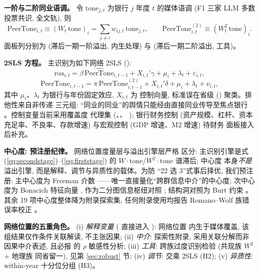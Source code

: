 \textbf{一阶与二阶同业语调。} 令 $\text{tone}_{j,t}$ 为银行 $j$
年度 $t$ 的媒体语调 (F1 三家 LLM 多数投票共识, 全文轨), 则
\begin{equation}
\text{PeerTone}_{i,t} \equiv (W_{t}\,\text{tone})_{i}
= \sum_{j \neq i} w_{ij,t}\,\text{tone}_{j,t},
\qquad
\text{PeerTone}^{(2)}_{i,t} \equiv (W_{t}^{2}\,\text{tone})_{i}.
\label{eq:peertone}
\end{equation}
面板列分别为  (滞后一期一阶溢出,
内生处理) 与  (滞后一期二阶溢出,
工具)。

\textbf{2SLS 方程。} 主识别为如下网络 2SLS
():
\begin{equation}
\text{roa}_{i,t} = \beta\,\widehat{\text{PeerTone}}_{i,t-1}
 + X_{i,t}'\gamma + \mu_{i} + \lambda_{t} + \varepsilon_{i,t},
\label{eq:secondstage}
\end{equation}
\begin{equation}
\text{PeerTone}_{i,t-1} = \pi\,\text{PeerTone}^{(2)}_{i,t-1}
 + X_{i,t}'\delta + \mu_{i} + \lambda_{t} + \nu_{i,t},
\label{eq:firststage}
\end{equation}
其中 $\mu_{i}$、$\lambda_{t}$ 为银行与年份固定效应, $X_{i,t}$ 为
控制向量, 标准误在省级 () 聚类。排他性来自非传递
三元组: ``同业的同业''的舆情只能经由直接同业传导至焦点银行
\parencite{bramoulle2009identification}。控制变量当前采用覆盖度
代理集 (、、
); 银行财务控制 (资产规模、杠杆、资本
充足率、不良率、存款增速) 与宏观控制 (GDP 增速、M2 增速) 待财务
面板接入后补充。

\textbf{中心度: 预注册纪律。} 网络位置度量层与溢出引擎层严格
区分: 主识别引擎是式 (\ref{eq:secondstage})--(\ref{eq:firststage})
的 $W\cdot\text{tone}$/$W^{2}\cdot\text{tone}$ 谱滞后; 中心度
本身\emph{不是}溢出引擎, 而是解释、调节与异质性的载体。为防
``22 选 3''式事后择优, 我们预注册: 主中心度为 Freeman 介数
 \parencite{freeman1978centrality}
——唯一直接量化``跨群信息中介''的中心度; 次中心度为 Bonacich
特征向量 
\parencite{bonacich1972factoring}, 作为二分图信息枢纽对照
\parencite{borgatti1997network,han2024brokerage}; 结构洞对照为
Burt 约束  \parencite{burt1992structural}。
其余 19 项中心度整体降为附录探索集, 任何附录使用均报告
Romano--Wolf 族错误率校正 \parencite{romano2005stepwise}。

\textbf{网络位置的五重角色。} (i) \emph{解释变量}
( 直接进入 ): 网络位置
内生于媒体覆盖, 该组结果仅作条件关联解读, 不主张因果;
(ii) \emph{中介}: 探索性附录, 采用关联分解而非因果中介表述,
且必报 \textcite{imai2010identification} 的 $\rho$ 敏感性分析;
(iii) \emph{工具}: 跨族过度识别检验 (共现族 $W^{2}$ + 地理族
同省留一), 见第 \ref{sec:robust} 节; (iv) \emph{调节}: 交乘 2SLS
(H2); (v) \emph{异质性}: within-year 十分位分组 (H3)。

